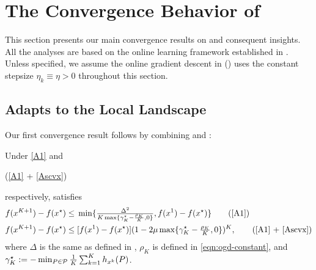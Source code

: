 \section{The Convergence Behavior of {\hdm} \label{sec:hdm}}

This section presents our main convergence results on {\hdm} and consequent insights. All the analyses are based on the online learning framework established in . Unless specified, we assume the online gradient descent in {\hdm} () uses the constant stepsize $\eta_k \equiv \eta > 0$ throughout this section.

\subsection{{\hdm} Adapts to the Local  Landscape} \label{sec:global-conv}

Our first convergence result follows by combining  and :
\begin{thm}\label{thm:adaptivity}
Under \ref{A1} and \begin{rm}{(\ref{A1} + \ref{Ascvx})}\end{rm} respectively,  satisfies
\begin{align}
f (x^{K + 1}) - f (x^{\star}) & \leq{} \min \{ \tfrac{\Delta^2}{K \max\{ \gamma_K^{\star} - \frac{\rho_K}{K}, 0 \} }, f (x^1) - f (x^{\star}) \} \tag{\ref{A1}} \\
    f (x^{K + 1}) - f (x^{\star}) & \leq{} [f (x^1) - f (x^{\star})] ( 1 - 2 \mu \max\{ \gamma_K^{\star} - \tfrac{\rho_K}{K}, 0 \}
    )^K, \tag{\ref{A1} + \ref{Ascvx}}
\end{align}
where $\Delta$ is the same as defined in , $\rho_K$ is defined in \eqref{eqn:ogd-constant}, and $\gamma_K^{\star} := - \min_{P \in \mathcal{P}}  \tfrac{1}{K} \textstyle\sum_{k = 1}^K h_{x^k}(P)$.
\end{thm}

